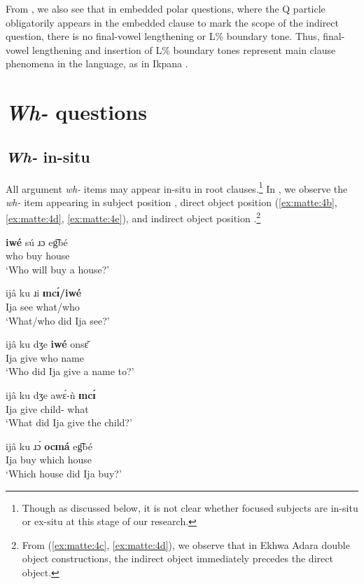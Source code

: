\documentclass[output=paper,colorlinks,citecolor=brown
]{langscibook}
\begin{document}
\noindent From , we also see that in embedded polar questions, where the Q particle obligatorily appears in the embedded clause to mark the scope of the indirect question, there is no final-vowel lengthening or L\% boundary tone. Thus, final-vowel lengthening and insertion of L\% boundary tones represent main clause phenomena in the language, as in Ikpana \citep{KandybowiczKatsuda2023}.

\section{\textit{Wh-} questions} \label{sec:matte:3}

\subsection{\textit{Wh-} in-situ} \label{sec:matte:3.1}

All argument \textit{wh-} items may appear in-situ in root clauses.\footnote{Though as discussed below, it is not clear whether focused subjects are in-situ or ex-situ at this stage of our research.} In , we observe the \textit{wh-} item appearing in subject position , direct object position (\ref{ex:matte:4b}, \ref{ex:matte:4d}, \ref{ex:matte:4e}), and indirect object position .\footnote{From (\ref{ex:matte:4c}, \ref{ex:matte:4d}), we observe that in Ekhwa Adara double object constructions, the indirect object immediately precedes the direct object.}

\ea \label{ex:matte:4}
\begin{xlist}

\ex \label{ex: matte:4a}
\gll \textbf{iwé} sú ɹɔ eg͡bé\\
who \Fut{} buy house\\
\glt `Who will buy a house?'

\ex \label{ex:matte:4b}
\gll ijâ ku ɹi \textbf{ɪncɪ́/iwé}\\
Ija \Pfv{} see what/who\\
\glt `What/who did Ija see?'

\ex \label{ex:matte:4c}
\gll ijâ ku dʒe \textbf{iwé} onsɛ̌\\
Ija \Pfv{} give who name\\
\glt `Who did Ija give a name to?'

\ex \label{ex:matte:4d}
\gll ijâ ku dʒe awɛ́-ǹ \textbf{ɪncɪ́}\\
Ija \Pfv{} give child-\Def{} what\\
\glt `What did Ija give the child?'

\ex \label{ex:matte:4e}
\gll ijâ ku ɹɔ́ \textbf{ocɪná} eg͡bé\\
Ija \Pfv{} buy which house\\
\glt `Which house did Ija buy?'

\end{xlist}
\z
\end{document}
